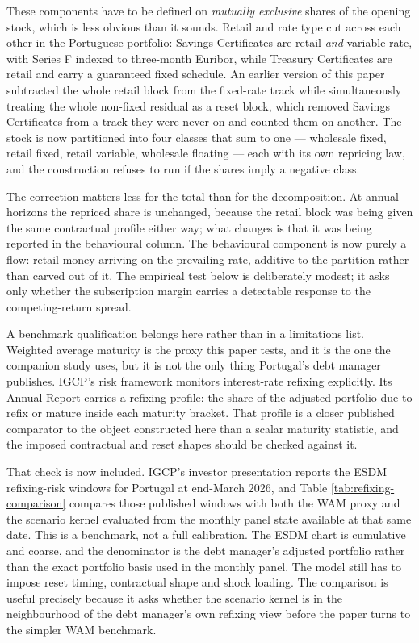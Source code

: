 \documentclass[11pt,a4paper]{article}
\begin{document}
These components have to be defined on \emph{mutually exclusive} shares of the
opening stock, which is less obvious than it sounds. Retail and rate type cut
across each other in the Portuguese portfolio: Savings Certificates are retail
\emph{and} variable-rate, with Series F indexed to three-month Euribor, while
Treasury Certificates are retail and carry a guaranteed fixed schedule. An
earlier version of this paper subtracted the whole retail block from the
fixed-rate track while simultaneously treating the whole non-fixed residual as
a reset block, which removed Savings Certificates from a track they were never
on and counted them on another. The stock is now partitioned into four classes
that sum to one --- wholesale fixed, retail fixed, retail variable, wholesale
floating --- each with its own repricing law, and the construction refuses to
run if the shares imply a negative class.

The correction matters less for the total than for the decomposition. At annual
horizons the repriced share is unchanged, because the retail block was being
given the same contractual profile either way; what changes is that it was
being reported in the behavioural column. The behavioural component is now
purely a flow: retail money arriving on the prevailing rate, additive to the
partition rather than carved out of it. The empirical test
below is deliberately modest; it asks only whether the subscription margin
carries a detectable response to the competing-return spread.

A benchmark qualification belongs here rather than in a limitations list.
Weighted average maturity is the proxy this paper tests, and it is the one the
companion study uses, but it is not the only thing Portugal's debt manager
publishes. IGCP's risk framework monitors interest-rate refixing explicitly.
Its Annual Report carries a refixing profile: the share of the adjusted
portfolio due to refix or mature inside each maturity bracket. That profile is
a closer published comparator to the object constructed here than a scalar
maturity statistic, and the imposed contractual and reset shapes should be
checked against it.

That check is now included. IGCP's investor presentation reports the ESDM
refixing-risk windows for Portugal at end-March 2026, and Table
\ref{tab:refixing-comparison} compares those published windows with both the
WAM proxy and the scenario kernel evaluated from the monthly panel state
available at that same date. This is a benchmark, not a full calibration. The
ESDM chart is cumulative and coarse, and the denominator is the debt manager's
adjusted portfolio rather than the exact portfolio basis used in the monthly
panel. The model still has to impose reset timing, contractual shape and shock
loading. The comparison is useful precisely because it asks whether the
scenario kernel is in the neighbourhood of the debt manager's own refixing view
before the paper turns to the simpler WAM benchmark.
\end{document}
